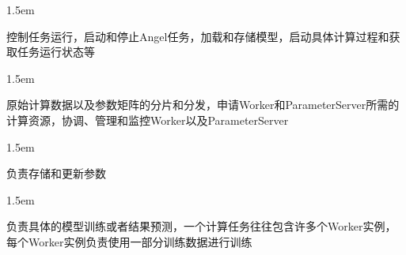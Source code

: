 \documentclass{article}
\begin{document}
\begin{mddefinitions}%


\begin{mdbmarginx}{}{}{}{1.5em}%
\begin{mddefdata}%
\hspace*{1em}\hspace*{1em}控制任务运行，启动和停止Angel任务，加载和存储模型，启动具体计算过程和获取任务运行状态等
\end{mddefdata}%
\end{mdbmarginx}%


\begin{mdbmarginx}{}{}{}{1.5em}%
\begin{mddefdata}%
\hspace*{1em}\hspace*{1em}原始计算数据以及参数矩阵的分片和分发，申请Worker和ParameterServer所需的计算资源，协调、管理和监控Worker以及ParameterServer
\end{mddefdata}%
\end{mdbmarginx}%


\begin{mdbmarginx}{}{}{}{1.5em}%
\begin{mddefdata}%
\hspace*{1em}\hspace*{1em}负责存储和更新参数
\end{mddefdata}%
\end{mdbmarginx}%


\begin{mdbmarginx}{}{}{}{1.5em}%
\begin{mddefdata}%
\hspace*{1em}\hspace*{1em}负责具体的模型训练或者结果预测，一个计算任务往往包含许多个Worker实例，每个Worker实例负责使用一部分训练数据进行训练%
\end{mddefdata}%
\end{mdbmarginx}%
\end{mddefinitions}%
\end{document}
